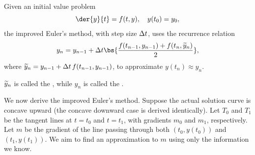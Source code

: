 \begin{recipe}
    Given an initial value problem \[\der{y}{t} = f(t, y), \quad y(t_0) = y_0,\] the improved Euler's method, with step size $\Delta t$, uses the recurrence relation \[y_{n} = y_{n-1} + \D t \bs{\frac{f(t_{n-1}, y_{n-1}) + f(t_{n}, \wt{y}_{n})}{2}},\] where $\widetilde{y}_{n} = y_{n-1} + \Delta t \, f(t_{n-1}, y_{n-1})$, to approximate $y(t_n) \approx y_n$.
\end{recipe}

\begin{definition}
    $\widetilde{y}_{n}$ is called the , while $y_{n}$ is called the .
\end{definition}

We now derive the improved Euler's method. Suppose the actual solution curve is concave upward (the concave downward case is derived identically). Let $T_0$ and $T_1$ be the tangent lines at $t = t_0$ and $t = t_1$, with gradients $m_0$ and $m_1$, respectively. Let $m$ be the gradient of the line passing through both $(t_0, y(t_0))$ and $(t_1, y(t_1))$. We aim to find an approximation to $m$ using only the information we know.

